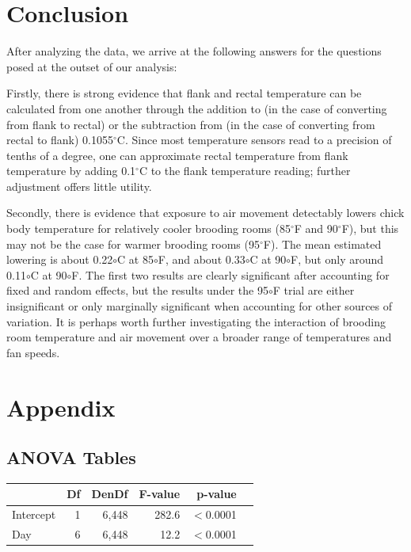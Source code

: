 \documentclass[a4paper, 10pt, titlepage]{article}
\begin{document}
\section{Conclusion}
After analyzing the data, we arrive at the following answers for the questions posed at the outset of our analysis:

Firstly, there is strong evidence that flank and rectal temperature can be calculated from one another through the addition to (in the case of converting from flank to rectal) or the subtraction from (in the case of converting from rectal to flank) 0.1055${^\circ}$C. Since most temperature sensors read to a precision of tenths of a degree, one can approximate rectal temperature from flank temperature by adding 0.1$^{\circ}$C to the flank temperature reading; further adjustment offers little utility.

Secondly, there is evidence that exposure to air movement detectably lowers chick body temperature for relatively cooler brooding rooms (85$^{\circ}$F and 90$^{\circ}$F), but this may not be the case for warmer brooding rooms (95$^{\circ}$F). The mean estimated lowering is about 0.22${\circ}$C at 85${\circ}$F, and about 0.33${\circ}$C at 90${\circ}$F, but only around 0.11${\circ}$C at 90${\circ}$F. The first two results are clearly significant after accounting for fixed and random effects, but the results under the 95${\circ}$F trial are either insignificant or only marginally significant when accounting for other sources of variation. It is perhaps worth further investigating the interaction of brooding room temperature and air movement over a broader range of temperatures and fan speeds.

\newpage

\section{Appendix}
\subsection{ANOVA Tables}
\begin{table}[!htb]
\centering
{} 
\begin{tabular}{lrrrrr}
  \hline
 & Df & DenDf & F-value & p-value \\ 
  \hline
  Intercept & 1 & 6,448 & 282.6 & $<$0.0001\\
  Day & 6 & 6,448 & 12.2 & $<$0.0001\\
   \hline
\end{tabular}
\end{table}
\end{document}
